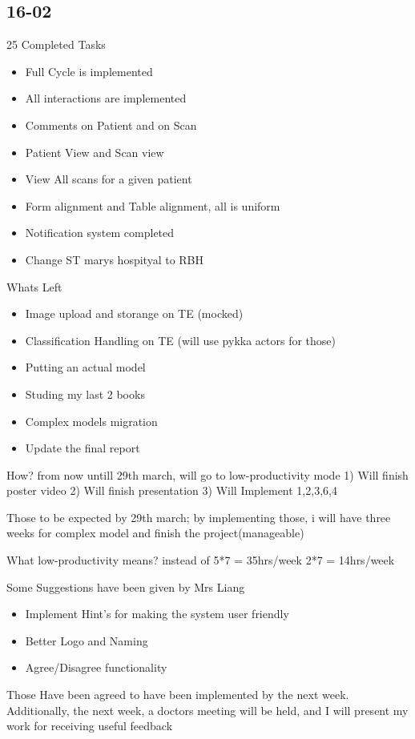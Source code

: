 \documentclass[a4paper,11pt,oneside]{book}
\begin{document}
	\subsection{16-02}
	25 Completed Tasks
	\begin{itemize}
		\item Full Cycle is implemented
		\item All interactions are implemented
		\item Comments on Patient and on Scan
		\item Patient View and Scan view
		\item View All scans for a given patient
		\item Form alignment and Table alignment, all is uniform 
		\item Notification system completed
		\item Change ST marys hospityal to RBH
	\end{itemize}
	Whats Left
	\begin{itemize}
		\item Image upload and storange on TE (mocked)
		\item Classification Handling on TE (will use pykka actors for those)
		\item Putting an actual model
		\item Studing my last 2 books
		\item Complex models migration
		\item Update the final report
	\end{itemize}
	
	How? 
	from now untill 29th march, will go to low-productivity mode
	1) Will finish poster video
	2) Will finish presentation
	3) Will Implement 1,2,3,6,4
	
	Those to be expected by 29th march; by implementing those, i will have three weeks for 
	complex model and finish the project(manageable)
	
	What low-productivity means?
	instead of 5*7 = 35hrs/week
	2*7 = 14hrs/week
	
	Some Suggestions have been given by Mrs Liang
	\begin{itemize}
		\item Implement Hint's for making the system user friendly
		\item Better Logo and Naming
		\item Agree/Disagree functionality
	\end{itemize}
	Those Have been agreed to have been implemented by the next week.
	Additionally, the next week, a doctors meeting will be held, and I will present my work for receiving useful feedback
\end{document}
